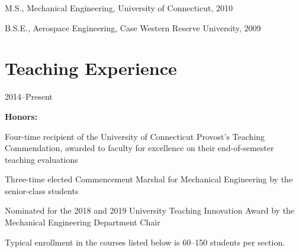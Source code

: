 M.S., Mechanical Engineering, University of Connecticut, 2010

B.S.E., Aerospace Engineering, Case Western Reserve University, 2009

\section{{\sectionfont{} Teaching Experience}}

 \hfill 2014--Present

\textbf{Honors:}

\begin{innerlist}
    \item Four-time recipient of the University of Connecticut Provost's Teaching Commendation, awarded to faculty for excellence on their end-of-semester teaching evaluations
    \item Three-time elected Commencement Marshal for Mechanical Engineering by the senior-class students
    \item Nominated for the 2018 and 2019 University Teaching Innovation Award by the Mechanical Engineering Department Chair
\end{innerlist}
\vspace{0.5\baselineskip}
Typical enrollment in the courses listed below is 60--150 students per section.
